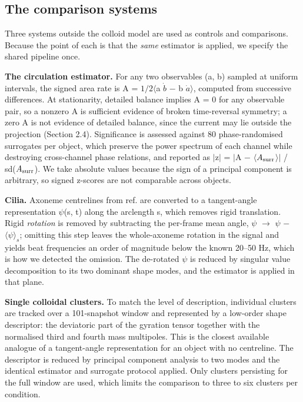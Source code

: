 \documentclass[aps,pre,preprint,superscriptaddress,nofootinbib,longbibliography]{revtex4-2}
\begin{document}
\subsection{The comparison systems}

Three systems outside the colloid model are used as controls and comparisons. Because the point of each is that the \emph{same} estimator is applied, we specify the shared pipeline once.

\textbf{The circulation estimator.} For any two observables (a, b) sampled at uniform intervals, the signed area rate is A = $1/2 \langle$a $\dot{b}$ $-$ b $\dot{a} \rangle$, computed from successive differences. At stationarity, detailed balance implies A = 0 for any observable pair, so a nonzero A is sufficient evidence of broken time-reversal symmetry; a zero A is not evidence of detailed balance, since the current may lie outside the projection (Section 2.4). Significance is assessed against 80 phase-randomised surrogates per object, which preserve the power spectrum of each channel while destroying cross-channel phase relations, and reported as
$|$z$|$ = $|$A $-$ $\langle$$A_{\rm surr}$$\rangle |$ / sd($A_{\rm surr}$). We take absolute values because the sign of a principal component is arbitrary, so signed z-scores are not comparable across objects.

\textbf{Cilia.} Axoneme centrelines from ref. \cite{r6} are converted to a tangent-angle representation $\psi$(s, t) along the arclength s, which removes rigid translation. Rigid \emph{rotation} is removed by subtracting the per-frame mean angle, $\psi$ $\rightarrow$ $\psi$ $-$ $\langle\psi\rangle_s$; omitting this step leaves the whole-axoneme rotation in the signal and yields beat frequencies an order of magnitude below the known 20--50 Hz, which is how we detected the omission. The de-rotated $\psi$ is reduced by singular value decomposition to its two dominant shape modes, and the estimator is applied in that plane.

\textbf{Single colloidal clusters.} To match the level of description, individual clusters are tracked over a 101-snapshot window and represented by a low-order shape descriptor: the deviatoric part of the gyration tensor together with the normalised third and fourth mass multipoles. This is the closest available analogue of a tangent-angle representation for an object with no centreline. The descriptor is reduced by principal component analysis to two modes and the identical estimator and surrogate protocol applied. Only clusters persisting for the full window are used, which limits the comparison to three to six clusters per condition.
\end{document}
